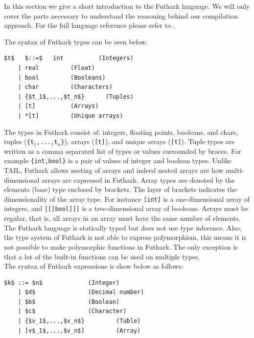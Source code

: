 \documentclass[11pt]{article}
\begin{document}
In this section we give a short introduction to the Futhark language. We will only cover the parts necessary to understand
the reasoning behind our compilation approach. For the full language reference please refer to \cite{TroelsHenriksen}.

The syntax of Futhark types can be seen below.
\begin{lstlisting}[numbers=none,frame=none]
$t$   $::=$   int          (Integers)
    | real         (Float)
    | bool         (Booleans)
    | char         (Characters)
    | {$t_1$,...,$t_n$}      (Tuples)
    | [t]          (Arrays)
    | *[t]         (Unique arrays)
\end{lstlisting}
The types in Futhark consist of: integers, floating points, booleans, and chars, tuples ({\tt \{t$_1$,...,t$_n$\}}), arrays ({\tt [t]}), and unique arrays ({\tt *[t]}).
Tuple types are written as a comma separated list of types or values surrounded by braces. For example {\tt\{int,bool\}} is 
a pair of values of integer and boolean types.
Unlike TAIL, Futhark allows nesting of arrays and indeed nested arrays are how multi-dimensional arrays are expressed in Futhark.
Array types are denoted by the elements (base) type enclosed by brackets.
The layer of brackets indicates the dimensionality of the array type.
For instance {\tt [int]} is a one-dimensional array of integers, and {\tt [[[bool]]]} is a tree-dimensional array of booleans.
Arrays must be regular, that is, all arrays in an array must have the same number of elements. \\

The Futhark language is statically typed but does not use type inference. Also, the type system of Futhark is not 
able to express polymorphism, this means it is not possible to make polymorphic functions in Futhark.
The only exception is that a lot of the built-in functions can be used on multiple types.\\

The syntax of Futhark expressions is show below as follows:
\begin{lstlisting}[numbers=none,frame=none]
$k$ ::= $n$				(Integer)
    | $d$				(Decimal number)
    | $b$				(Boolean) 		
    | $c$ 				(Character)
    | {$v_1$,...,$v_n$} 		(Tuble)
    | [v$_1$,...,$v_n$] 		(Array)
\end{lstlisting}
\end{document}
